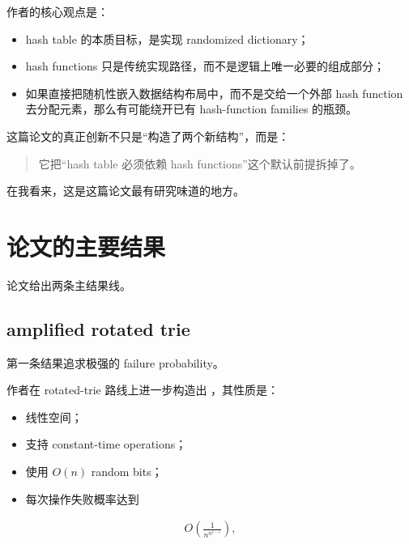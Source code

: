 \documentclass[12pt]{article}
\begin{document}
作者的核心观点是：

\begin{itemize}

\item hash table 的本质目标，是实现 randomized dictionary；

\item hash functions 只是传统实现路径，而不是逻辑上唯一必要的组成部分；

\item 如果直接把随机性嵌入数据结构布局中，而不是交给一个外部 hash function 去分配元素，那么有可能绕开已有 hash-function families 的瓶颈。

\end{itemize}

这篇论文的真正创新不只是“构造了两个新结构”，而是：

\begin{quote}它把“hash table 必须依赖 hash functions”这个默认前提拆掉了。\end{quote}

在我看来，这是这篇论文最有研究味道的地方。

\section{论文的主要结果}

论文给出两条主结果线。

\subsection{amplified rotated trie}

第一条结果追求极强的 failure probability。

作者在 rotated-trie 路线上进一步构造出 \texttt{}，其性质是：

\begin{itemize}

\item 线性空间；

\item 支持 constant-time operations；

\item 使用 \(O(n)\) random bits；

\item 每次操作失败概率达到

\end{itemize}

\[\begin{aligned}
O\left(\frac{1}{n^{n^{1-\epsilon}}}\right),
\end{aligned}\]
\end{document}

